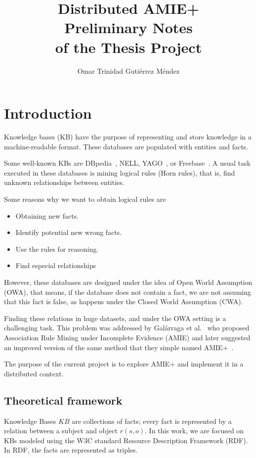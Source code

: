 \documentclass{article}
\title{
Distributed AMIE+\\
\large Preliminary Notes\\
of the Thesis Project\\
}
\author{Omar Trinidad Guti\'errez M\'endez}
\begin{document}
\maketitle

\section{Introduction}

Knowledge bases (KB) have the purpose of representing and store knowledge in a
machine-readable format. These databases are populated with entities and facts.

Some well-known KBs are DBpedia~\cite{dbpedia-swj},
NELL, YAGO~\cite{suchanek2007yago}, or Freebase~\cite{bollacker2008freebase}. A
usual task executed in these databases is mining logical rules (Horn rules), that is, find
unknown relationships between entities.

Some reasons why we want to obtain logical rules are

\begin{itemize}
    \item Obtaining new facts.
    \item Identify potential new wrong facts.
    \item Use the rules for reasoning.
    \item Find especial relationships
\end{itemize}

However,  these databases are designed under the idea of Open World Assumption
(OWA), that means, if the database does not contain a fact, we are not assuming
that this fact is false, as happens under the Closed World Assumption (CWA).

Finding these relations in huge datasets, and under the OWA setting is a
challenging task. This problem was addressed by Galárraga et
al.~\cite{galarraga2013amie}  who proposed Association Rule Mining under
Incomplete Evidence (AMIE) and later suggested an improved version of the same
method that they simple named AMIE+~\cite{galarraga2015fast}.

The purpose of the current project is to explore AMIE+ and implement it in a
distributed context.

\subsection{Theoretical framework}

Knowledge Bases $KB$ are collections of facts; every fact is represented by a
relation between a subject and object $r(s, o)$. In this work, we are focused
on KBs modeled using the W3C standard Resource Description Framework
(RDF). In RDF, the facts are represented as triples.
\end{document}
